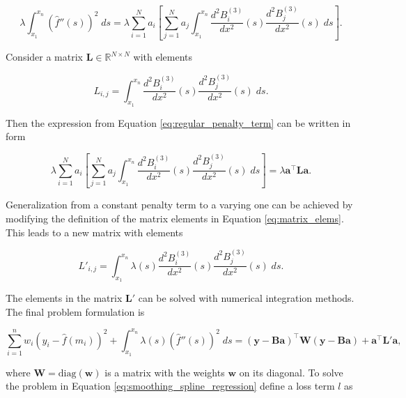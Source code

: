 \documentclass[a4paper]{artikel3}
\newcommand{\R}{\mathbb{R}}    %
\numberwithin{equation}{section}
\numberwithin{theorem}{section}
\numberwithin{proposition}{section}
\numberwithin{lemma}{section}
\begin{document}
\begin{equation}
    \label{eq:regular_penalty_term}
    \lambda\int_{x_1}^{x_n} \left( \hat{f}''(s) \right)^2 \; ds = \lambda \sum_{i=1}^N a_i \left[ \sum_{j=1}^N a_j \int_{x_1}^{x_n} \frac{d^2 B_i^{(3)}}{d x^2}(s) \frac{d^2 B_j^{(3)}}{d x^2}(s) \; ds \right] .
\end{equation}

Consider a matrix $\mathbf{L} \in \R^{N \times N}$ with elements 

\begin{equation}
    \label{eq:matrix_elems}
    L_{i, j} = \int_{x_1}^{x_n} \frac{d^2 B_i^{(3)}}{d x^2}(s) \frac{d^2 B_j^{(3)}}{d x^2}(s) \; ds .
\end{equation}

Then the expression from Equation \eqref{eq:regular_penalty_term} can be written in form

\begin{equation*}
    \lambda \sum_{i=1}^N a_i \left[ \sum_{j=1}^N a_j \int_{x_1}^{x_n} \frac{d^2 B_i^{(3)}}{d x^2}(s) \frac{d^2 B_j^{(3)}}{d x^2}(s) \; ds \right] = \lambda \mathbf{a}^\top \mathbf{L} \mathbf{a} .
\end{equation*}

Generalization from a constant penalty term to a varying one can be achieved by modifying the definition of the matrix elements in Equation \eqref{eq:matrix_elems}. This leads to a new matrix with elements 

\begin{equation*}
    L'_{i, j} = \int_{x_1}^{x_n} \lambda(s) \frac{d^2 B_i^{(3)}}{d x^2}(s) \frac{d^2 B_j^{(3)}}{d x^2}(s) \; ds .
\end{equation*}

The elements in the matrix $\mathbf{L}'$ can be solved with numerical integration methods. The final problem formulation is

\begin{equation}
    \label{eq:smoothing_spline_regression}
    \sum_{i=1}^n w_i (y_i - \hat{f}(m_i))^2 + \int_{x_1}^{x_n} \lambda(s) (\hat{f}''(s))^2 \; ds = (\mathbf{y} - \mathbf{B} \mathbf{a})^\top \mathbf{W} (\mathbf{y} - \mathbf{B} \mathbf{a}) + \mathbf{a}^\top \mathbf{L}' \mathbf{a} ,
\end{equation}

where $\mathbf{W} = \text{diag}(\mathbf{w})$ is a matrix with the weights $\mathbf{w}$ on its diagonal. To solve the problem in Equation \eqref{eq:smoothing_spline_regression} define a loss term $l$ as 
\end{document}

